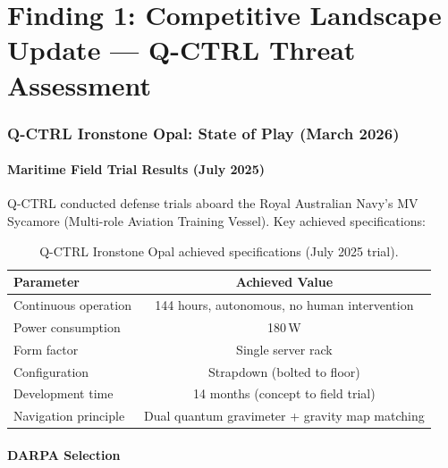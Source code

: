 \documentclass[11pt]{article}
\theoremstyle{definition}
\theoremstyle{remark}
\begin{document}
\part{Finding 1: Competitive Landscape Update --- Q-CTRL Threat Assessment}
\label{part:qctrl}

\section{Q-CTRL Ironstone Opal: State of Play (March 2026)}
\label{sec:qctrl-status}

\subsection{Maritime Field Trial Results (July 2025)}

Q-CTRL conducted defense trials aboard the Royal Australian Navy's MV
Sycamore (Multi-role Aviation Training Vessel). Key achieved specifications:

\begin{table}[H]
\centering
\caption{Q-CTRL Ironstone Opal achieved specifications (July 2025 trial).}
\label{tab:qctrl-specs}
\begin{tabular}{@{}lc@{}}
\toprule
Parameter & Achieved Value \\
\midrule
Continuous operation & 144 hours, autonomous, no human intervention \\
Power consumption & 180\,W \\
Form factor & Single server rack \\
Configuration & Strapdown (bolted to floor) \\
Development time & 14 months (concept to field trial) \\
Navigation principle & Dual quantum gravimeter + gravity map matching \\
\bottomrule
\end{tabular}
\end{table}

\subsection{DARPA Selection}
\end{document}
